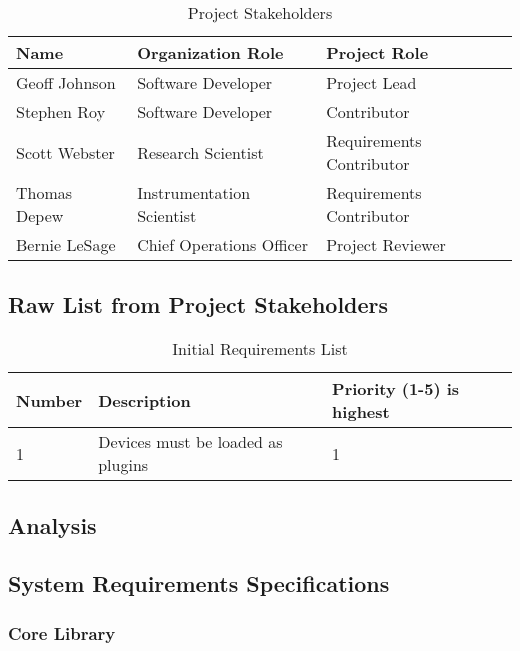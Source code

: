 \documentclass[11pt]{article}
\begin{document}
    \begin{table}[H]
      \centering
      \begin{tabular}{l p{6cm} p{6cm}}
        \toprule
        Name & Organization Role & Project Role \\ [0.5ex]
        \midrule
        Geoff Johnson & Software Developer        & Project Lead \\
        Stephen Roy   & Software Developer        & Contributor \\
        Scott Webster & Research Scientist        & Requirements Contributor \\
        Thomas Depew  & Instrumentation Scientist & Requirements Contributor \\
        Bernie LeSage & Chief Operations Officer  & Project Reviewer \\
        \bottomrule
      \end{tabular}
      \caption{Project Stakeholders}\label{tab:stakeholders}
    \end{table}

    \subsection{Raw List from Project Stakeholders}\label{sec:req-sh}

      \begin{table}[H]
        \centering
        \begin{tabular}{l p{11cm} p{3cm}}
          \toprule
          Number & Description & Priority (1-5)\newline 1 is highest \\ [0.5ex]
          \midrule
          1 & Devices must be loaded as plugins & 1 \\
          \bottomrule
        \end{tabular}
        \caption{Initial Requirements List}\label{tab:requirements}
      \end{table}

    \subsection{Analysis}\label{sec:req-analyze}

    \subsection{System Requirements Specifications}\label{sec:req-srs}

      \subsubsection{Core Library}\label{sec:req-srs-core}
\end{document}
